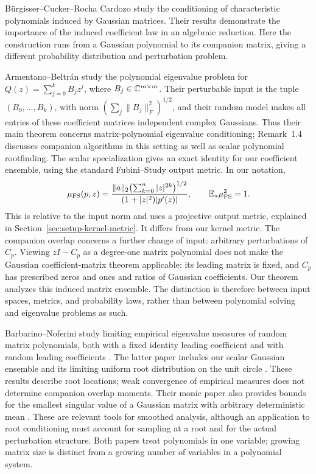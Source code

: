 B\"urgisser--Cucker--Rocha Cardozo \cite{burgisser2015characteristic} study
the conditioning of characteristic polynomials induced by Gaussian matrices.
Their results demonstrate the importance of the induced coefficient law in
an algebraic reduction. Here the construction runs from a Gaussian polynomial
to its companion matrix, giving a different probability distribution and
perturbation problem.

Armentano--Beltr\'an \cite[Theorem~1.1]{armentano2019polynomial} study the
polynomial eigenvalue problem for
$Q(z)=\sum_{j=0}^k B_jz^j$, where $B_j\in\mathbb C^{m\times m}$.
Their perturbable input is the tuple $(B_0,\ldots,B_k)$, with norm
$(\sum_j\|B_j\|_F^2)^{1/2}$, and their random model makes all entries of these
coefficient matrices independent complex Gaussians. Thus their main theorem
concerns matrix-polynomial eigenvalue conditioning; Remark~1.4 discusses
companion algorithms in this setting as well as scalar polynomial rootfinding.
The scalar specialization \cite[Section~3.1]{armentano2019polynomial} gives an
exact identity for our coefficient ensemble, using the standard Fubini--Study
output metric. In our notation,
\[
 \mu_{\mathrm{FS}}(p,z)
 =\frac{\|a\|_2\bigl(\sum_{k=0}^n|z|^{2k}\bigr)^{1/2}}
        {(1+|z|^2)|p'(z)|},\qquad \mathbb E_*\mu_{\mathrm{FS}}^2=1.
\]
This is relative to the input norm and uses a projective output metric,
explained in Section~\ref{sec:setup-kernel-metric}. It differs from our kernel
metric. The companion overlap concerns a further change of input: arbitrary
perturbations of $C_p$. Viewing $zI-C_p$ as a degree-one matrix polynomial does
not make the Gaussian coefficient-matrix theorem applicable: its leading
matrix is fixed, and $C_p$ has prescribed zeros and ones and ratios of Gaussian
coefficients. Our theorem analyzes this induced matrix ensemble. The distinction
is therefore between input spaces, metrics, and probability laws, rather than
between polynomial solving and eigenvalue problems as such.

Barbarino--Noferini study limiting empirical eigenvalue measures of random
matrix polynomials, both with a fixed identity leading coefficient
\cite{barbarino2023monic} and with random leading coefficients
\cite{barbarino2022limit}. The latter paper includes our scalar Gaussian
ensemble and its limiting uniform root distribution on the unit circle
\cite[Theorem~1.2]{barbarino2022limit}. These results describe root locations;
weak convergence of empirical measures does not determine companion overlap
moments. Their monic paper also provides bounds for the smallest singular
value of a Gaussian matrix with arbitrary deterministic mean
\cite[Theorem~A.5]{barbarino2023monic}. These are relevant tools for smoothed
analysis, although an application to root conditioning must account for
sampling at a root and for the actual perturbation structure. Both papers
treat polynomials in one variable; growing matrix size is distinct from a
growing number of variables in a polynomial system.
